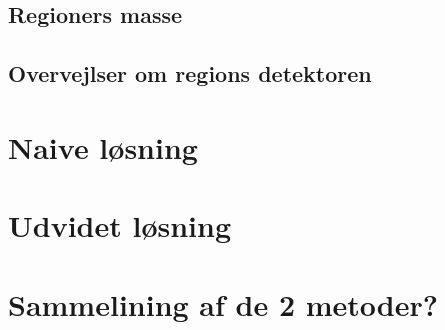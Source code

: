 {\subsection{Regioners masse}


\subsection{Overvejlser om regions detektoren}


\section{Naive løsning}

\clearpage

\section{Udvidet løsning}

\clearpage

\section{Sammelining af de 2 metoder?}

\clearpage


}

